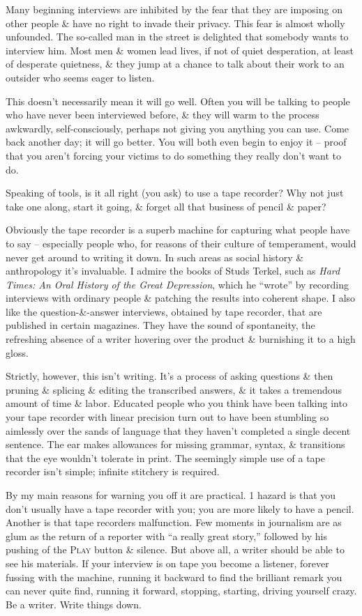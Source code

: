 \documentclass{article}
\begin{document}
Many beginning interviews are inhibited by the fear that they are imposing on other people \& have no right to invade their privacy. This fear is almost wholly unfounded. The so-called man in the street is delighted that somebody wants to interview him. Most men \& women lead lives, if not of quiet desperation, at least of desperate quietness, \& they jump at a chance to talk about their work to an outsider who seems eager to listen.

This doesn't necessarily mean it will go well. Often you will be talking to people who have never been interviewed before, \& they will warm to the process awkwardly, self-consciously, perhaps not giving you anything you can use. Come back another day; it will go better. You will both even begin to enjoy it -- proof that you aren't forcing your victims to do something they really don't want to do.

Speaking of tools, is it all right (you ask) to use a tape recorder? Why not just take one along, start it going, \& forget all that business of pencil \& paper?

Obviously the tape recorder is a superb machine for capturing what people have to say -- especially people who, for reasons of their culture of temperament, would never get around to writing it down. In such areas as social history \& anthropology it's invaluable. I admire the books of Studs Terkel, such as \textit{Hard Times: An Oral History of the Great Depression}, which he ``wrote'' by recording interviews with ordinary people \& patching the results into coherent shape. I also like the question-\&-answer interviews, obtained by tape recorder, that are published in certain magazines. They have the sound of spontaneity, the refreshing absence of a writer hovering over the product \& burnishing it to a high gloss.

Strictly, however, this isn't writing. It's a process of asking questions \& then pruning \& splicing \& editing the transcribed answers, \& it takes a tremendous amount of time \& labor. Educated people who you think have been talking into your tape recorder with linear precision turn out to have been stumbling so aimlessly over the sands of language that they haven't completed a single decent sentence. The ear makes allowances for missing grammar, syntax, \& transitions that the eye wouldn't tolerate in print. The seemingly simple use of a tape recorder isn't simple; infinite stitchery is required.

By my main reasons for warning you off it are practical. 1 hazard is that you don't usually have a tape recorder with you; you are more likely to have a pencil. Another is that tape recorders malfunction. Few moments in journalism are as glum as the return of a reporter with ``a really great story,'' followed by his pushing of the \textsc{Play} button \& silence. But above all, a writer should be able to see his materials. If your interview is on tape you become a listener, forever fussing with the machine, running it backward to find the brilliant remark you can never quite find, running it forward, stopping, starting, driving yourself crazy. Be a writer. Write things down.
\end{document}
